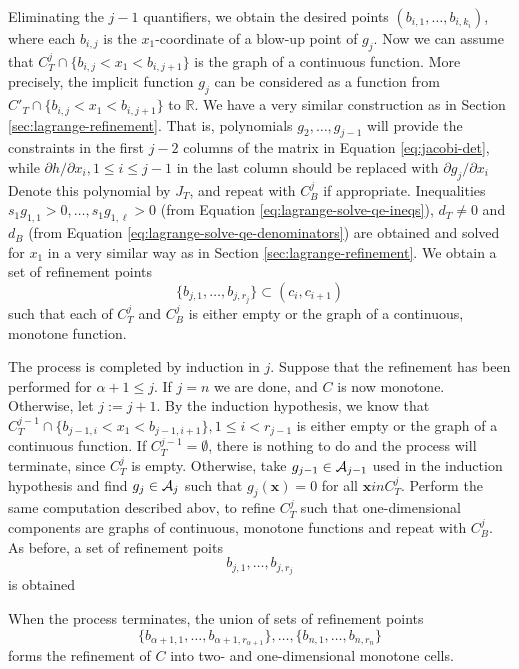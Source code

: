 \documentclass[
]{book}
\theoremstyle{definition}
\theoremstyle{definition}
\theoremstyle{definition}
\theoremstyle{definition}
\theoremstyle{remark}
\begin{document}
Eliminating the \(j-1\) quantifiers, we obtain the desired points \((b_{i,1},\ldots,b_{i,k_i})\), where each \(b_{i,j}\) is the \(x_1\)-coordinate of a blow-up point of \(g_j\).
Now we can assume that \(C^j_T\cap \{ b_{i,j} < x_1 < b_{i,j+1}\}\) is the graph of a continuous function. More precisely, the implicit function \(g_j\) can be considered as a function from \(C'_T \cap \{ b_{i,j} < x_1 < b_{i,j+1}\}\) to \(\mathbb{R}\). We have a very similar construction as in Section \ref{sec:lagrange-refinement}.
That is, polynomials \(g_2,\ldots,g_{j-1}\) will provide the constraints in the first \(j-2\) columns of the matrix in Equation \eqref{eq:jacobi-det}, while \(\partial h / \partial x_i, 1 \le i \le j - 1\) in the last column should be replaced with \(\partial g_j / \partial x_i\)
Denote this polynomial by \(J_T\), and repeat with \(C^j_B\) if appropriate. Inequalities \(s_1 g_{1,1} > 0, \ldots, s_1 g_{1,\ell} > 0\) (from Equation \eqref{eq:lagrange-solve-qe-ineqs}), \(d_T \ne 0\) and \(d_B\) (from Equation \eqref{eq:lagrange-solve-qe-denominators}) are obtained and solved for \(x_1\) in a very similar way as in Section \ref{sec:lagrange-refinement}. We obtain a set of refinement points
\[
\{ b_{j,1}, \ldots, b_{j,r_j} \} \subset (c_i,c_{i+1})
\]
such that each of \(C^j_T\) and \(C^j_B\) is either empty or the graph of a continuous, monotone function.

The process is completed by induction in \(j\). Suppose that the refinement has been performed for \(\alpha + 1 \le j\). If \(j = n\) we are done, and \(C\) is now monotone. Otherwise, let \(j := j+1\). By the induction hypothesis, we know that \(C^{j-1}_T \cap \{b_{j-1,i} < x_1 < b_{j-1,i+1}\}, 1 \le i < r_{j-1}\) is either empty or the graph of a continuous function.
If \(C^{j-1}_T = \emptyset\), there is nothing to do and the process will terminate, since \(C^j_T\) is empty.
Otherwise, take \(g_{j-1} \in {\cal A}_{j-1}\) used in the induction hypothesis and find \(g_j \in {\cal A}_j\) such that \(g_j(\mathbf{x}) = 0\) for all \(\mathbf{x} in C^j_T\).
Perform the same computation described abov, to refine \(C^j_T\) such that one-dimensional components are graphs of continuous, monotone functions and repeat with \(C^j_B\).
As before, a set of refinement poits
\[
b_{j,1}, \ldots, b_{j,r_j}
\]
is obtained

When the process terminates, the union of sets of refinement points \[
\{b_{\alpha + 1,1}, \ldots, b_{\alpha + 1,r_{\alpha + 1}}\}, \ldots, \{b_{n,1}, \ldots, b_{n,r_n}\}
\]
forms the refinement of \(C\) into two- and one-dimensional monotone cells.
\end{document}
